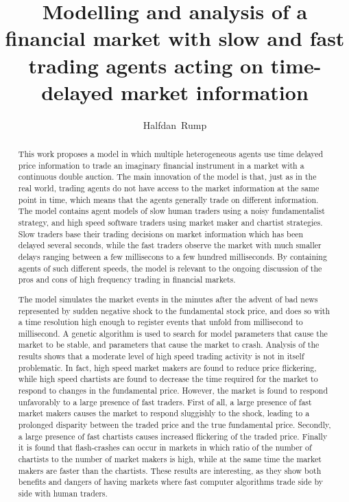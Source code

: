 \documentclass[12pt,a4j,twoside]{article}
\title{Modelling and analysis of a financial market with slow and fast trading agents acting on time-delayed market information}{5}%
\author{Halfdan~Rump}
\begin{document}
\maketitle
\begin{abstract}
This work proposes a model in which multiple heterogeneous agents use time delayed price information to trade an imaginary financial instrument in a market with a continuous double auction. The main innovation of the model is that, just as in the real world, trading agents do not have access to the market information at the same point in time, which means that the agents generally trade on different information. The model contains agent models of slow human traders using a noisy fundamentalist strategy, and high speed software traders using market maker and chartist strategies. Slow traders base their trading decisions on market information which has been delayed several seconds, while the fast traders observe the market with much smaller delays ranging between a few millisecons to a few hundred milliseconds. By containing agents of such different speeds, the model is relevant to the ongoing discussion of the pros and cons of high frequency trading in financial markets. 

The model simulates the market events in the minutes after the advent of bad news represented by sudden negative shock to the fundamental stock price, and does so with a time resolution high enough to register events that unfold from millisecond to millisecond. A genetic algorithm is used to search for model parameters that cause the market to be stable, and parameters that cause the market to crash. Analysis of the results shows that a moderate level of high speed trading activity is not in itself problematic. In fact, high speed market makers are found to reduce price flickering, while high speed chartists are found to decrease the time required for the market to respond to changes in the fundamental price. However, the market is found to respond unfavorably to a large presence of fast traders. First of all, a large presence of fast market makers causes the market to respond sluggishly to the shock, leading to a prolonged disparity between the traded price and the true fundamental price. Secondly, a large presence of fast chartists causes increased flickering of the traded price. Finally it is found that flash-crashes can occur in markets in which ratio of the number of chartists to the number of market makers is high, while at the same time the market makers are faster than the chartists. These results are interesting, as they show both benefits and dangers of having markets where fast computer algorithms trade side by side with human traders.

\end{abstract}
\end{document}
